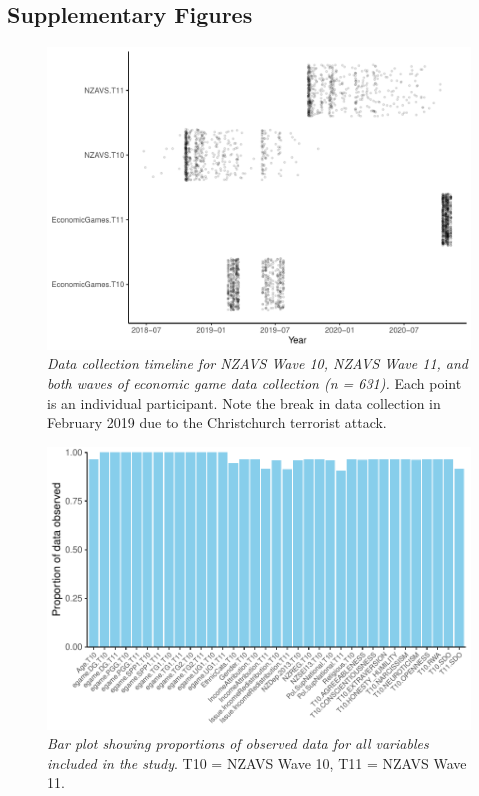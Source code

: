 \documentclass[
  man,floatsintext]{apa6}
\begin{document}
\newpage

\hypertarget{supplementary-figures}{%
\subsection{Supplementary Figures}\label{supplementary-figures}}






\begin{figure}
\centering
\includegraphics{manuscript_files/figure-latex/timelinePlot-1.pdf}
\caption{\label{fig:timelinePlot}\emph{Data collection timeline for NZAVS Wave 10, NZAVS
Wave 11, and both waves of economic game data collection (n = 631).} Each point is an individual participant. Note
the break in data collection in February 2019 due to the Christchurch
terrorist attack.}
\end{figure}

\newpage




\begin{figure}
\centering
\includegraphics{manuscript_files/figure-latex/plotObs-1.pdf}
\caption{\label{fig:plotObs}\emph{Bar plot showing proportions of observed data for all
variables included in the study}. T10 = NZAVS Wave 10, T11 = NZAVS Wave 11.}
\end{figure}
\end{document}

